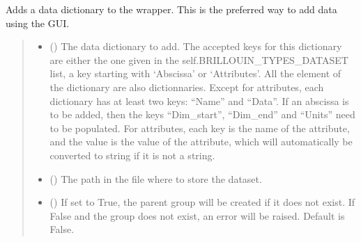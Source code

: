 \documentclass[letterpaper,10pt,english]{sphinxmanual}
\begin{document}
\begin{fulllineitems}

\begin{fulllineitems}
\label{\detokenize{source/_autosummary/HDF5_BLS.Wrapper:HDF5_BLS.Wrapper.add_dictionary}}
\pysigstartsignatures
\pysiglinewithargsret
{}
{\sphinxparamcomma {}\sphinxparamcomma {}\sphinxparamcomma {}\sphinxparamcomma {}}
{}
\pysigstopsignatures
\sphinxAtStartPar
Adds a data dictionary to the wrapper. This is the preferred way to add data using the GUI.
\begin{quote}\begin{description}
\begin{itemize}
\item {} 
\sphinxAtStartPar
{} () \textendash{} The data dictionary to add. The accepted keys for this dictionary are either the one given in the self.BRILLOUIN\_TYPES\_DATASET list, a key starting with ‘Abscissa’ or ‘Attributes’.
All the element of the dictionary are also dictionnaries.
Except for attributes, each dictionary has at least two keys: “Name” and “Data”. If an abscissa is to be added, then the keys “Dim\_start”, “Dim\_end” and “Units” need to be populated.
For attributes, each key is the name of the attribute, and the value is the value of the attribute, which will automatically be converted to string if it is not a string.

\item {} 
\sphinxAtStartPar
{} (\sphinxstyleliteralemphasis{\sphinxupquote{, }}) \textendash{} The path in the file where to store the dataset.

\item {} 
\sphinxAtStartPar
{} (\sphinxstyleliteralemphasis{\sphinxupquote{, }}) \textendash{} If set to True, the parent group will be created if it does not exist. If False and the group does not exist, an error will be raised. Default is False.


\end{itemize}
\end{description}
\end{quote}
\end{fulllineitems}
\end{fulllineitems}
\end{document}
